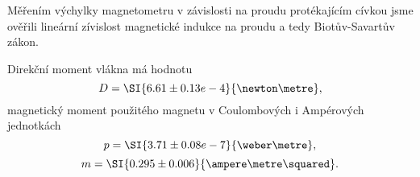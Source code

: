 \documentclass[0-protokol.tex]{subfiles}
\begin{document}
Měřením výchylky magnetometru v závislosti na proudu protékajícím cívkou jsme ověřili lineární zívislost magnetické indukce na proudu a tedy Biotův-Savartův zákon.

Direkční moment vlákna má hodnotu
$$ D = \SI{6.61 \pm 0.13 e-4}{\newton\metre}, $$
magnetický moment použitého magnetu v Coulombových i Ampérových jednotkách
$$ p = \SI{3.71 \pm 0.08 e-7}{\weber\metre}, $$
$$ m = \SI{0.295 \pm 0.006}{\ampere\metre\squared}. $$
\end{document}
